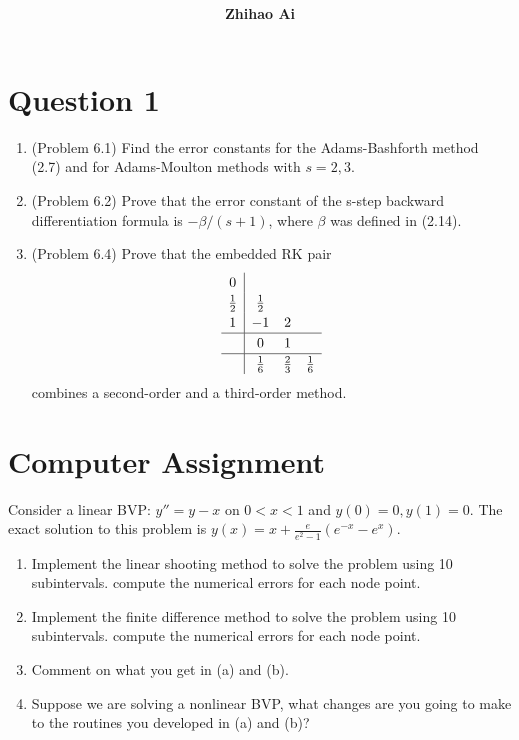 \documentclass[10pt]{report}
\title{
	\vspace{2in}
	\textmd{\textbf{\hwCourse\\\hwTitle}}\\
	\vspace{0.3in}\large{\textit{\hmwkClassInstructor}}
	\vspace{3in}
}
\author{\textbf{Zhihao Ai}}
\date{}
\begin{document}
\maketitle

\section*{Question 1}
\begin{enumerate}
	\item 
	(Problem 6.1) Find the error constants for the Adams-Bashforth method (2.7) and for Adams-Moulton methods with $s = 2, 3$.
	
	\item 
	(Problem 6.2) Prove that the error constant of the s-step backward differentiation formula is $-\beta/(s + 1)$, where $\beta$ was defined in (2.14).
	
	\item 
	(Problem 6.4) Prove that the embedded RK pair
	\[
	\renewcommand{\arraystretch}{1.2}
	\begin{array}{c|ccc}
	0 &&&\\
	\frac{1}{2} & \frac{1}{2} &&\\
	1 & -1 & 2 &\\ \hline
	& 0 & 1 &\\ \hline
	& \frac{1}{6} & \frac{2}{3} & \frac{1}{6}
	\end{array}
	\]
	combines a second-order and a third-order method.
\end{enumerate}

\section*{Computer Assignment}
Consider a linear BVP: $y'' = y - x$ on $0<x<1$ and $y(0)=0, y(1)=0$. The exact solution to this problem is $y(x) = x + \frac{e}{e^2-1}(e^{-x}-e^x)$.
\begin{enumerate}
	\item 
	Implement the linear shooting method to solve the problem using 10 subintervals. compute the numerical errors for each node point.
	
	\item 
	Implement the finite difference method to solve the problem using 10 subintervals. compute the numerical errors for each node point.
	
	\item 
	Comment on what you get in (a) and (b).
	
	\item 
	Suppose we are solving a nonlinear BVP, what changes are you going to make to the routines you developed in (a) and (b)?
\end{enumerate}
\end{document}
